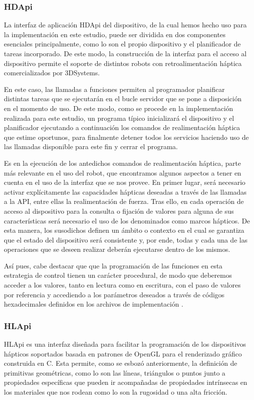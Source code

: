 \subsubsection{HDApi}
La interfaz de aplicación HDApi del dispositivo, de la cual hemos hecho uso para la implementación en este estudio, puede ser dividida en dos componentes esenciales principalmente, como lo son el propio dispositivo y el planificador de tareas incorporado. De este modo, la construcción de la interfaz para el acceso al dispositivo permite el soporte de distintos robots con retroalimentación háptica comercializados por 3DSystems.

En este caso, las llamadas a funciones permiten al programador planificar distintas tareas que se ejecutarán en el bucle servidor que se pone a disposición en el momento de uso. De este modo, como se procede en la implementación realizada para este estudio, un programa típico inicializará el dispositivo y el planificador ejecutando a continuación los comandos de realimentación háptica que estime oportunos, para finalmente detener todos los servicios haciendo uso de las llamadas disponible para este fin y cerrar el programa.

Es en la ejecución de los antedichos comandos de realimentación háptica, parte más relevante en el uso del robot, que encontramos algunos aspectos a tener en cuenta en el uso de la interfaz que se nos provee. En primer lugar, será necesario activar explícitamente las capacidades hápticas deseadas a través de las llamadas a la API, entre ellas la realimentación de fuerza. Tras ello, en cada operación de acceso al dispositivo para la consulta o fijación de valores para alguna de sus características será necesario el uso de los denominados como marcos hápticos. De esta manera, los susodichos definen un ámbito o contexto en el cual se garantiza que el estado del dispositivo será consistente y, por ende, todas y cada una de las operaciones que se deseen realizar deberán  ejecutarse dentro de los mismos.

Así pues, cabe destacar que que la programación de las funciones en esta estrategia de control tienen un carácter procedural, de modo que deberemos acceder a los valores, tanto en lectura como en escritura, con el paso de valores por referencia y accediendo a los parámetros deseados a través de códigos hexadecimales definidos en los archivos de implementación \cite{77}.

\subsubsection{HLApi}
HLApi es una interfaz diseñada para facilitar la programación de los dispositivos hápticos soportados basada en patrones de OpenGL para el renderizado gráfico construida en C. Esta permite, como se esbozó anteriormente, la definición de primitivas geométricas, como lo son las líneas, triángulos o puntos junto a propiedades específicas que pueden ir acompañadas de propiedades intrínsecas en los materiales que nos rodean como lo son la rugosidad o una alta fricción. 

